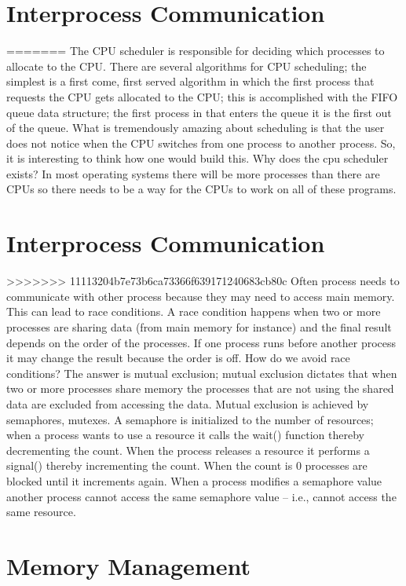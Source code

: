 \documentclass{amsbook}
\begin{document}
\section{Interprocess Communication}

=======
The CPU scheduler is responsible for deciding which processes to allocate to the CPU. There are several algorithms for CPU scheduling; the simplest is a first come, first served algorithm in which the first process that requests the CPU gets allocated to the CPU; this is accomplished with the FIFO queue data structure; the first process in that enters the queue it is the first out of the queue. What is tremendously amazing about scheduling is that the user does not notice when the CPU switches from one process to another process. So, it is interesting to think how one would build this. Why does the cpu scheduler exists? In most operating systems there will be more processes than there are CPUs so there needs to be a way for the CPUs to work on all of these programs.

\section{Interprocess Communication}

>>>>>>> 11113204b7e73b6ca73366f639171240683cb80c
Often process needs to communicate with other process because they may need to access main memory. This can lead to race conditions. A race condition happens when two or more processes are sharing data (from main memory for instance) and the final result depends on the order of the processes. If one process runs before another process it may change the result because the order is off. How do we avoid race conditions? The answer is mutual exclusion; mutual exclusion dictates that when two or more processes share memory the processes that are not using the shared data are excluded from accessing the data. Mutual exclusion is achieved by semaphores, mutexes. A semaphore is initialized to the number of resources; when a process wants to use a resource it calls the wait() function thereby decrementing the count. When the process releases a resource it performs a signal() thereby incrementing the count. When the count is 0 processes are blocked until it increments again. When a process modifies a semaphore value another process cannot access the same semaphore value -- i.e., cannot access the same resource.

\section{Memory Management}
\end{document}
